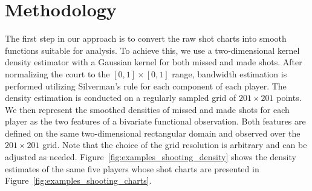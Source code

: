\section{Methodology} %
\label{sec:method}



The first step in our approach is to convert the raw shot charts into smooth functions suitable for analysis. To achieve this, we use a two-dimensional kernel density estimator with a Gaussian kernel for both missed and made shots. After normalizing the court to the $[0, 1] \times [0, 1]$ range, bandwidth estimation is performed utilizing Silverman's rule \citep{silvermanDensityEstimationStatistics1986} for each component of each player. The density estimation is conducted on a regularly sampled grid of $201 \times 201$ points. We then represent the smoothed densities of missed and made shots for each player as the two features of a bivariate functional observation. Both features are defined on the same two-dimensional rectangular domain and observed over the $201 \times 201$ grid. Note that the choice of the grid resolution is arbitrary and can be adjusted as needed. Figure~\ref{fig:examples_shooting_density} shows the density estimates of the same five players whose shot charts are presented in Figure~\ref{fig:examples_shooting_charts}.

